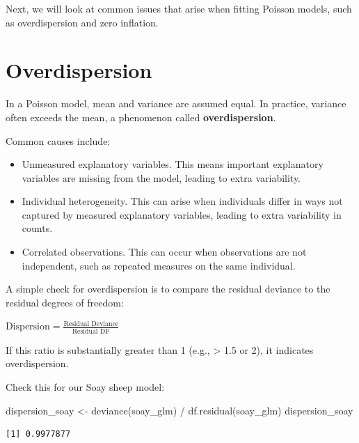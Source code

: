 \documentclass[
  letterpaper,
  8pt,
  a4paper]{book}
\newenvironment{Shaded}{\begin{snugshade}}{\end{snugshade}}
\newcommand{\FunctionTok}[1]{\textcolor[rgb]{0.28,0.35,0.67}{#1}}
\newcommand{\NormalTok}[1]{\textcolor[rgb]{0.00,0.23,0.31}{#1}}
\newcommand{\OtherTok}[1]{\textcolor[rgb]{0.00,0.23,0.31}{#1}}
\newcommand{\SpecialCharTok}[1]{\textcolor[rgb]{0.37,0.37,0.37}{#1}}
\providecommand{\tightlist}{%
  \setlength{\itemsep}{0pt}\setlength{\parskip}{0pt}}
\begin{document}
Next, we will look at common issues that arise when fitting Poisson
models, such as overdispersion and zero inflation.

\section*{Overdispersion}\label{overdispersion}


In a Poisson model, mean and variance are assumed equal. In practice,
variance often exceeds the mean, a phenomenon called
\textbf{overdispersion}.

Common causes include:

\begin{itemize}
\tightlist
\item
  Unmeasured explanatory variables. This means important explanatory
  variables are missing from the model, leading to extra variability.
\item
  Individual heterogeneity. This can arise when individuals differ in
  ways not captured by measured explanatory variables, leading to extra
  variability in counts.
\item
  Correlated observations. This can occur when observations are not
  independent, such as repeated measures on the same individual.
\end{itemize}

A simple check for overdispersion is to compare the residual deviance to
the residual degrees of freedom:

\(\text{Dispersion} = \frac{\text{Residual Deviance}}{\text{Residual DF}}\)

If this ratio is substantially greater than 1 (e.g., \textgreater{} 1.5
or 2), it indicates overdispersion.

Check this for our Soay sheep model:

\begin{Shaded}
\begin{Highlighting}[]
\NormalTok{dispersion\_soay }\OtherTok{\textless{}{-}} \FunctionTok{deviance}\NormalTok{(soay\_glm) }\SpecialCharTok{/} \FunctionTok{df.residual}\NormalTok{(soay\_glm)}
\NormalTok{dispersion\_soay}
\end{Highlighting}
\end{Shaded}

\begin{verbatim}
[1] 0.9977877
\end{verbatim}
\end{document}
